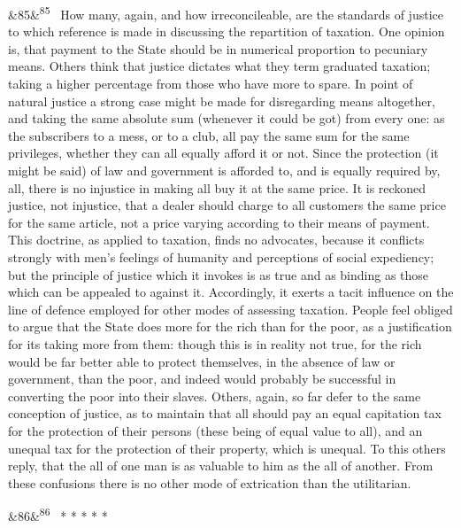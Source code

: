 \documentclass[12pt]{article}
\newcommand{\para}[1][]{\par\noindent\ifx&#1&\else\textsuperscript{\footnotesize #1}~\fi}
\begin{document}
\para[85] How many, again, and how irreconcileable, are the standards of justice to which reference is made in discussing the repartition of taxation. One opinion is, that payment to the State should be in numerical proportion to pecuniary means. Others think that justice dictates what they term graduated taxation; taking a higher percentage from those who have more to spare. In point of natural justice a strong case might be made for disregarding means altogether, and taking the same absolute sum (whenever it could be got) from every one: as the subscribers to a mess, or to a club, all pay the same sum for the same privileges, whether they can all equally afford it or not. Since the protection (it might be said) of law and government is afforded to, and is equally required by, all, there is no injustice in making all buy it at the same price. It is reckoned justice, not injustice, that a dealer should charge to all customers the same price for the same article, not a price varying according to their means of payment. This doctrine, as applied to taxation, finds no advocates, because it conflicts strongly with men's feelings of humanity and perceptions of social expediency; but the principle of justice which it invokes is as true and as binding as those which can be appealed to against it. Accordingly, it exerts a tacit influence on the line of defence employed for other modes of assessing taxation. People feel obliged to argue that the State does more for the rich than for the poor, as a justification for its taking more from them: though this is in reality not true, for the rich would be far better able to protect themselves, in the absence of law or government, than the poor, and indeed would probably be successful in converting the poor into their slaves. Others, again, so far defer to the same conception of justice, as to maintain that all should pay an equal capitation tax for the protection of their persons (these being of equal value to all), and an unequal tax for the protection of their property, which is unequal. To this others reply, that the all of one man is as valuable to him as the all of another. From these confusions there is no other mode of extrication than the utilitarian.

\para[86] * * * * *
\end{document}
